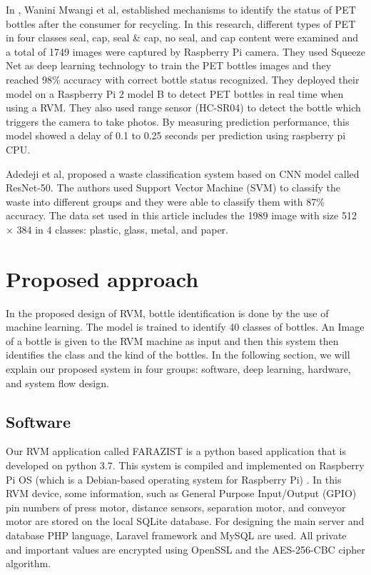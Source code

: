 \documentclass[conference]{IEEEtran}
\begin{document}
In \cite{mwangi2019using}, Wanini Mwangi et al, established mechanisms to identify the status of PET bottles after the consumer for recycling. In this research, different types of PET in four classes seal, cap, seal & cap, no seal, and cap content were examined and a total of 1749 images were captured by Raspberry Pi camera. They used Squeeze Net as deep learning technology to train the PET bottles images and they reached 98\% accuracy with correct bottle status recognized. They deployed their model on a Raspberry Pi 2 model B to detect PET bottles in real time when using a RVM. They also used range sensor (HC-SR04) to detect the bottle which triggers the camera to take photos. By measuring prediction performance, this model showed a delay of 0.1 to 0.25 seconds per prediction using raspberry pi CPU.\par

Adedeji et al,\cite{adedeji2019intelligent} proposed a waste classification system based on CNN model called ResNet-50. The authors used  Support Vector Machine (SVM) to classify the waste into different groups and they were able to classify them with 87\% accuracy. The data set used in this article includes the 1989 image with size 512 × 384 in 4 classes: plastic, glass,  metal, and paper.

\section{Proposed approach}
In the proposed design of RVM, bottle identification is done by the use of machine learning. The model is trained to identify 40 classes of bottles. An Image of a bottle is given to the RVM machine as input and then this system then identifies the class and the kind of the bottles. In the following section, we will explain our proposed system in four groups: software, deep learning, hardware, and system flow design.

\subsection{Software}
Our RVM application called FARAZIST is a python based application that is developed on python 3.7. This system is compiled and implemented on Raspberry Pi OS (which is a Debian-based operating system for Raspberry Pi) \cite{2020raspberry}. In this RVM device, some information, such as General Purpose Input/Output (GPIO) pin numbers of press motor, distance sensors, separation motor, and conveyor motor are stored on the local SQLite database. For designing the main server and database PHP language, Laravel framework and MySQL are used. All private and important values are encrypted using OpenSSL and the AES-256-CBC cipher algorithm.\par
\end{document}
